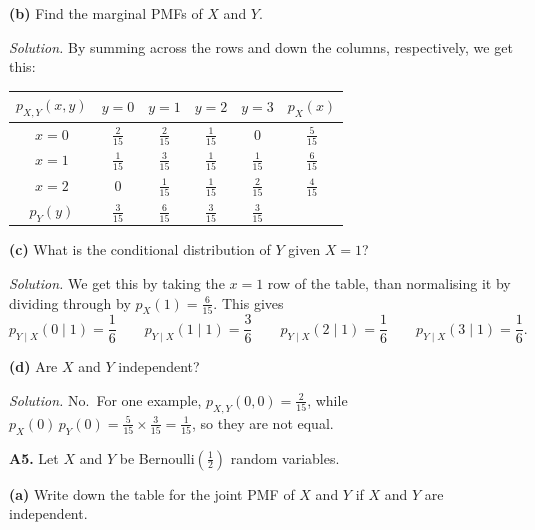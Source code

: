 \documentclass[
  a4paper,
]{book}
\theoremstyle{definition}
\theoremstyle{definition}
\theoremstyle{definition}
\theoremstyle{definition}
\theoremstyle{remark}
\begin{document}
\textbf{(b)} Find the marginal PMFs of \(X\) and \(Y\).

\begin{myanswers}

\emph{Solution.}
By summing across the rows and down the columns, respectively, we get this:

\begin{longtable}[]{@{}cccccc@{}}
\toprule
\(p_{X,Y}(x,y)\) & \(y = 0\) & \(y = 1\) & \(y = 2\) & \(y = 3\) & \(p_X(x)\) \\
\midrule
\endhead
\(x=0\) & \(\frac{2}{15}\) & \(\frac{2}{15}\) & \(\frac{1}{15}\) & \(0\) & \(\frac{5}{15}\) \\
\(x=1\) & \(\frac{1}{15}\) & \(\frac{3}{15}\) & \(\frac{1}{15}\) & \(\frac{1}{15}\) & \(\frac{6}{15}\) \\
\(x=2\) & \(0\) & \(\frac{1}{15}\) & \(\frac{1}{15}\) & \(\frac{2}{15}\) & \(\frac{4}{15}\) \\
\(p_Y(y)\) & \(\frac{3}{15}\) & \(\frac{6}{15}\) & \(\frac{3}{15}\) & \(\frac{3}{15}\) & \\
\bottomrule
\end{longtable}

\end{myanswers}

\textbf{(c)} What is the conditional distribution of \(Y\) given \(X = 1\)?

\begin{myanswers}
\emph{Solution.} We get this by taking the \(x = 1\) row of the table, than normalising it by dividing through by \(p_X(1) = \frac{6}{15}\). This gives
\[ p_{Y\mid X} (0 \mid 1) = \frac{1}{6} \qquad p_{Y\mid X} (1 \mid 1) = \frac{3}{6} \qquad p_{Y\mid X} (2 \mid 1) = \frac{1}{6} \qquad p_{Y\mid X} (3 \mid 1) = \frac{1}{6} . \]

\end{myanswers}

\textbf{(d)} Are \(X\) and \(Y\) independent?

\begin{myanswers}
\emph{Solution.} No.~For one example, \(p_{X,Y}(0,0) = \frac{2}{15}\), while \(p_X(0) \, p_Y(0) = \frac{5}{15} \times \frac{3}{15} = \frac{1}{15}\), so they are not equal.

\end{myanswers}

\textbf{A5.} Let \(X\) and \(Y\) be Bernoulli\((\frac12)\) random variables.

\textbf{(a)} Write down the table for the joint PMF of \(X\) and \(Y\) if \(X\) and \(Y\) are independent.
\end{document}
